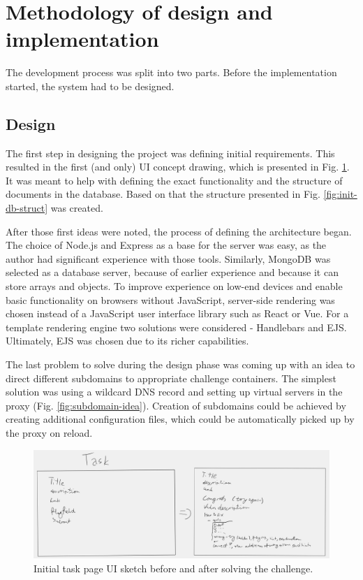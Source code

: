 \section{Methodology of design and implementation}

The development process was split into two parts. Before the implementation started, the system had to be designed.

\subsection{Design}

The first step in designing the project was defining initial requirements.
This resulted in the first (and only) UI concept drawing, which is presented in Fig. \ref{fig:init-ui-sketch}. It was meant to help with defining the exact functionality and the structure of documents in the database. Based on that the structure presented in Fig. \ref{fig:init-db-struct} was created.

After those first ideas were noted, the process of defining the architecture began. The choice of Node.js and Express as a base for the server was easy, as the author had significant experience with those tools. Similarly, MongoDB was selected as a database server, because of earlier experience and because it can store arrays and objects. To improve experience on low-end devices and enable basic functionality on browsers without JavaScript, server-side rendering was chosen instead of a JavaScript user interface library such as React or Vue. For a template rendering engine two solutions were considered - Handlebars and EJS. Ultimately, EJS was chosen due to its richer capabilities.

The last problem to solve during the design phase was coming up with an idea to direct different subdomains to appropriate challenge containers. The simplest solution was using a wildcard DNS record and setting up virtual servers in the proxy (Fig. \ref{fig:subdomain-idea}). Creation of subdomains could be achieved by creating additional configuration files, which could be automatically picked up by the proxy on reload.

\begin{figure}
	\centering
	\includegraphics[width=\textwidth]{img/init-ui-sketch.png}
	\caption{Initial task page UI sketch before and after solving the challenge.}
	\label{fig:init-ui-sketch}
\end{figure}

